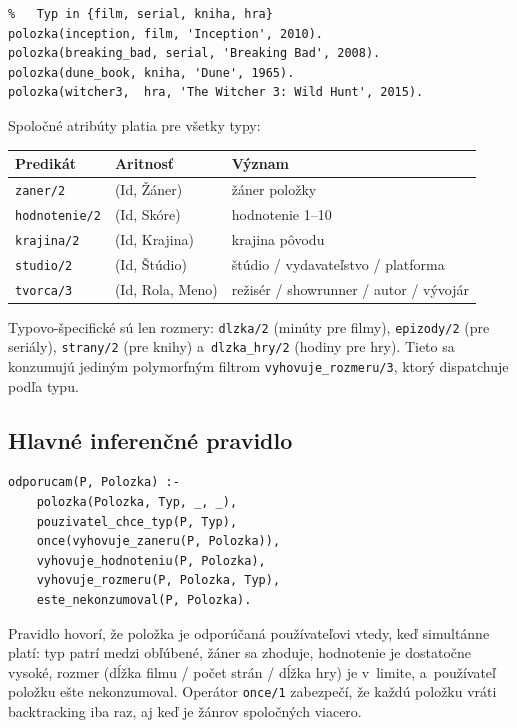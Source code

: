 \documentclass[11pt,a4paper]{article}
\begin{document}
\begin{lstlisting}[caption={Reprezentácia položiek}]
% polozka(+Id, +Typ, +Nazov, +Rok)
%   Typ in {film, serial, kniha, hra}
polozka(inception, film, 'Inception', 2010).
polozka(breaking_bad, serial, 'Breaking Bad', 2008).
polozka(dune_book, kniha, 'Dune', 1965).
polozka(witcher3,  hra, 'The Witcher 3: Wild Hunt', 2015).
\end{lstlisting}

Spoločné atribúty platia pre všetky typy:

\begin{center}
\begin{tabular}{lll}
\toprule
\textbf{Predikát} & \textbf{Aritnosť} & \textbf{Význam}\\
\midrule
\texttt{zaner/2}       & (Id, Žáner)       & žáner položky\\
\texttt{hodnotenie/2} & (Id, Skóre)       & hodnotenie 1--10\\
\texttt{krajina/2}    & (Id, Krajina)     & krajina pôvodu\\
\texttt{studio/2}     & (Id, Štúdio)      & štúdio / vydavateľstvo / platforma\\
\texttt{tvorca/3}     & (Id, Rola, Meno)  & režisér / showrunner / autor / vývojár\\
\bottomrule
\end{tabular}
\end{center}

Typovo-špecifické sú len rozmery: \texttt{dlzka/2} (minúty
pre filmy), \texttt{epizody/2} (pre seriály), \texttt{strany/2}
(pre knihy) a~\texttt{dlzka\_hry/2} (hodiny pre hry). Tieto sa konzumujú jediným polymorfným
filtrom \texttt{vyhovuje\_rozmeru/3}, ktorý dispatchuje podľa
typu.

\subsection{Hlavné inferenčné pravidlo}

\begin{lstlisting}
odporucam(P, Polozka) :-
    polozka(Polozka, Typ, _, _),
    pouzivatel_chce_typ(P, Typ),
    once(vyhovuje_zaneru(P, Polozka)),
    vyhovuje_hodnoteniu(P, Polozka),
    vyhovuje_rozmeru(P, Polozka, Typ),
    este_nekonzumoval(P, Polozka).
\end{lstlisting}

\noindent
Pravidlo hovorí, že položka je odporúčaná používateľovi vtedy,
keď simultánne platí: typ patrí medzi obľúbené, žáner sa
zhoduje, hodnotenie je dostatočne vysoké, rozmer (dĺžka filmu /
počet strán / dĺžka hry) je v~limite, a~používateľ položku ešte
nekonzumoval. Operátor \texttt{once/1} zabezpečí, že každú
položku vráti backtracking iba raz, aj keď je žánrov spoločných
viacero.
\end{document}
